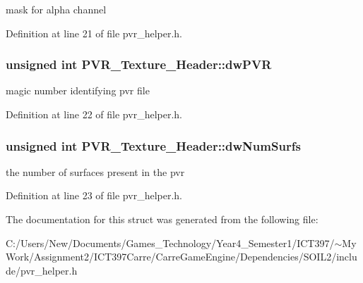 mask for alpha channel 

Definition at line 21 of file pvr\_\-helper.h.\hypertarget{struct_p_v_r___texture___header_1aa3e8921cb7576374622129a952dd72}{
\subsubsection[dwPVR]{\setlength{\rightskip}{0pt plus 5cm}unsigned int {\bf PVR\_\-Texture\_\-Header::dwPVR}}}
\label{struct_p_v_r___texture___header_1aa3e8921cb7576374622129a952dd72}


magic number identifying pvr file 

Definition at line 22 of file pvr\_\-helper.h.\hypertarget{struct_p_v_r___texture___header_b5a48ebff7ae60e21b335fb7f8d1c2e3}{
\subsubsection[dwNumSurfs]{\setlength{\rightskip}{0pt plus 5cm}unsigned int {\bf PVR\_\-Texture\_\-Header::dwNumSurfs}}}
\label{struct_p_v_r___texture___header_b5a48ebff7ae60e21b335fb7f8d1c2e3}


the number of surfaces present in the pvr 

Definition at line 23 of file pvr\_\-helper.h.

The documentation for this struct was generated from the following file:\begin{CompactItemize}
\item 
C:/Users/New/Documents/Games\_\-Technology/Year4\_\-Semester1/ICT397/$\sim$My Work/Assignment2/ICT397Carre/CarreGameEngine/Dependencies/SOIL2/include/pvr\_\-helper.h\end{CompactItemize}
